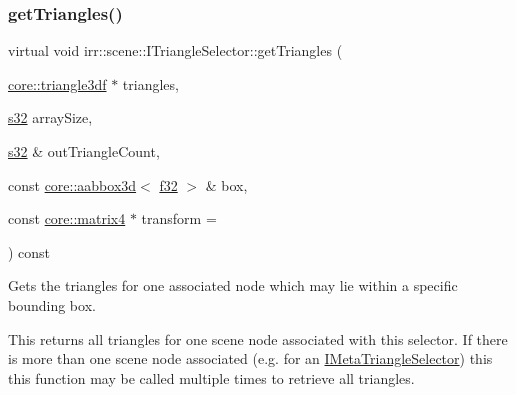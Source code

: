 \subsubsection{\texorpdfstring{get\+Triangles()}{getTriangles()}\hspace{0.1cm}{\footnotesize\ttfamily [2/3]}}
{\footnotesize\ttfamily virtual void irr\+::scene\+::\+I\+Triangle\+Selector\+::get\+Triangles (\begin{DoxyParamCaption}\item[{\hyperlink{namespaceirr_1_1core_a1112835405bbec5dadf031dc7934e7d0}{core\+::triangle3df} $\ast$}]{triangles,  }\item[{\hyperlink{namespaceirr_ac66849b7a6ed16e30ebede579f9b47c6}{s32}}]{array\+Size,  }\item[{\hyperlink{namespaceirr_ac66849b7a6ed16e30ebede579f9b47c6}{s32} \&}]{out\+Triangle\+Count,  }\item[{const \hyperlink{classirr_1_1core_1_1aabbox3d}{core\+::aabbox3d}$<$ \hyperlink{namespaceirr_a0277be98d67dc26ff93b1a6a1d086b07}{f32} $>$ \&}]{box,  }\item[{const \hyperlink{namespaceirr_1_1core_a73fa92e638c5ca97efd72da307cc9b65}{core\+::matrix4} $\ast$}]{transform = {} }\end{DoxyParamCaption}) const\hspace{0.3cm}{\ttfamily [pure virtual]}}



Gets the triangles for one associated node which may lie within a specific bounding box. 

This returns all triangles for one scene node associated with this selector. If there is more than one scene node associated (e.\+g. for an \hyperlink{classirr_1_1scene_1_1IMetaTriangleSelector}{I\+Meta\+Triangle\+Selector}) this this function may be called multiple times to retrieve all triangles.

